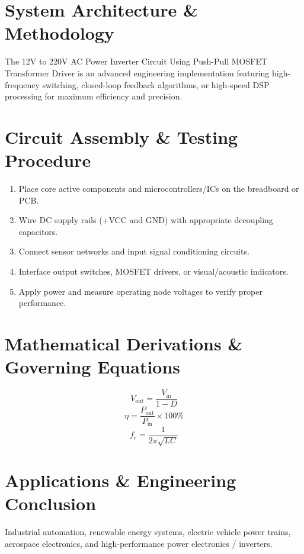 \documentclass[11pt,a4paper]{article}
\begin{document}
\section{System Architecture \& Methodology}
The 12V to 220V AC Power Inverter Circuit Using Push-Pull MOSFET Transformer Driver is an advanced engineering implementation featuring high-frequency switching, closed-loop feedback algorithms, or high-speed DSP processing for maximum efficiency and precision.

\section{Circuit Assembly \& Testing Procedure}
\begin{enumerate}
    \item Place core active components and microcontrollers/ICs on the breadboard or PCB.
    \item Wire DC supply rails (+VCC and GND) with appropriate decoupling capacitors.
    \item Connect sensor networks and input signal conditioning circuits.
    \item Interface output switches, MOSFET drivers, or visual/acoustic indicators.
    \item Apply power and measure operating node voltages to verify proper performance.
\end{enumerate}

\section{Mathematical Derivations \& Governing Equations}
\begin{equation}
V_{\text{out}} = \frac{V_{\text{in}}}{1 - D}
\end{equation}
\begin{equation}
\eta = \frac{P_{\text{out}}}{P_{\text{in}}} \times 100\%
\end{equation}
\begin{equation}
f_r = \frac{1}{2\pi \sqrt{L C}}
\end{equation}

\section{Applications \& Engineering Conclusion}
Industrial automation, renewable energy systems, electric vehicle power trains, aerospace electronics, and high-performance power electronics / inverters.
\end{document}
